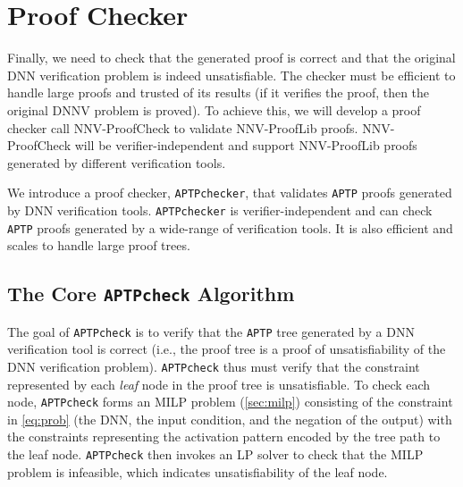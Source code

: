 \documentclass[oneside,11pt,dvipsnames]{book}
\newcommand{\prooflang}{\textsf{NNV-ProofLib}}
\newcommand{\proofcheck}{\textsf{NNV-ProofCheck}}
\newcommand{\nnproofcheck}{\texttt{APTPcheck}}
\newcommand{\nnproofchecker}{\texttt{APTPchecker}}
\newcommand{\nnproofformat}{\texttt{APTP}}
\begin{document}
\section{Proof Checker}\label{sec:proofchecker}
Finally, we need to check that the generated proof is correct and that the original DNN verification problem is indeed unsatisfiable. The checker must be efficient to handle large proofs and trusted of its results (if it verifies the proof, then the original DNNV problem is proved).
To achieve this, we will develop a proof checker call \proofcheck{} to validate \prooflang{} proofs.
\proofcheck{} will be verifier-independent and support \prooflang{} proofs generated by different verification tools. 



We introduce a proof checker, \nnproofchecker{}, that validates \nnproofformat{} proofs generated by DNN verification tools.
\nnproofchecker{} is verifier-independent and can check \nnproofformat{} proofs generated by a wide-range of verification tools.
It is also efficient and scales to handle large proof trees.

\subsection{The Core \nnproofcheck{} Algorithm}


The goal of \nnproofcheck{} is to verify that the \nnproofformat{} tree generated by a DNN verification tool is correct (i.e., the proof tree is a proof of unsatisfiability of the DNN verification problem).
\nnproofcheck{} thus must verify that the constraint represented by each \emph{leaf} node in the proof tree is unsatisfiable. To check each node, \nnproofcheck{} forms an MILP problem (\autoref{sec:milp}) consisting of the constraint in \autoref{eq:prob} (the DNN, the input condition, and the negation of the output) with the constraints representing the activation pattern encoded by the tree path to the leaf node. \nnproofcheck{} then invokes an LP solver to check that the MILP problem is infeasible, which indicates unsatisfiability of the leaf node. 
\end{document}
